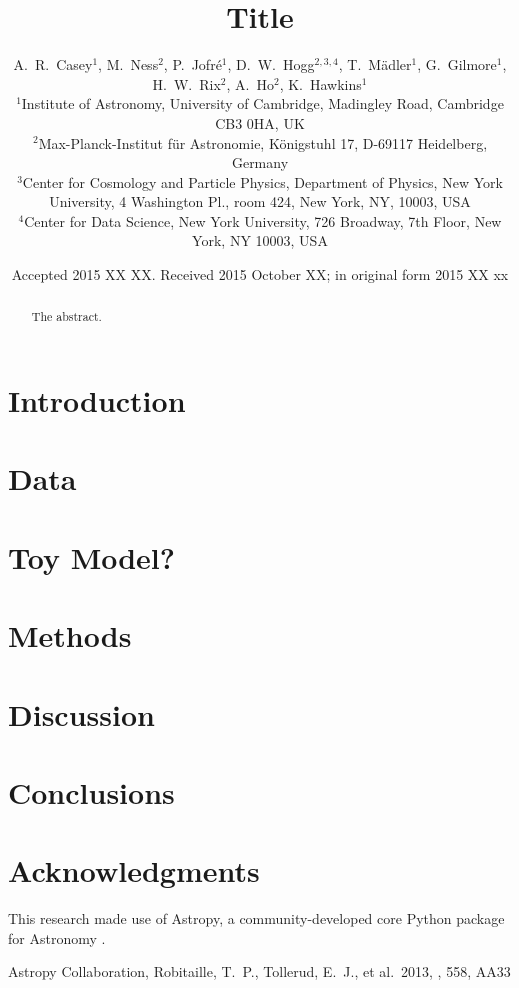 \documentclass[useAMS,usenatbib]{mn2e}
\title[Title]{Title}
\author[Casey et al.]{A.~R.~Casey$^1$, M.~Ness$^2$, P.~Jofr\'e$^1$, D.~W.~Hogg$^{2,3,4}$, T.~M\"adler$^1$, G.~Gilmore$^1$, H.~W.~Rix$^2$, \newauthor
A.~Ho$^2$, K.~Hawkins$^1$ \\ 
$^1$Institute of Astronomy, University of Cambridge, Madingley Road, Cambridge CB3 0HA, UK\\
$^2$Max-Planck-Institut f\"ur Astronomie, K\"onigstuhl 17, D-69117 Heidelberg, Germany\\
$^3$Center for Cosmology and Particle Physics, Department of Physics, New York University, 4 Washington Pl., room 424, New York, NY, 10003, USA\\
$^4$Center for Data Science, New York University, 726 Broadway, 7th Floor, New York, NY 10003, USA}
\begin{document}
\date{Accepted 2015 XX XX. Received 2015 October XX; in original form 2015 XX xx}

\pagerange{\pageref{firstpage}--\pageref{lastpage}} 

\maketitle

\label{firstpage}

\begin{abstract}
The abstract.
\end{abstract}

\begin{keywords}
\end{keywords}

\section{Introduction}

\section[]{Data}

\section[]{Toy Model?}

\section[]{Methods}

\section[]{Discussion}

\section{Conclusions}


\section*{Acknowledgments}
This research made use of Astropy, a community-developed core Python package for Astronomy \citep{astropy}.


\begin{thebibliography}{99}
 Astropy Collaboration, Robitaille, T.~P., Tollerud, E.~J., et al.\ 2013, \aap, 558, AA33
\end{thebibliography}


\label{lastpage}
\end{document}
